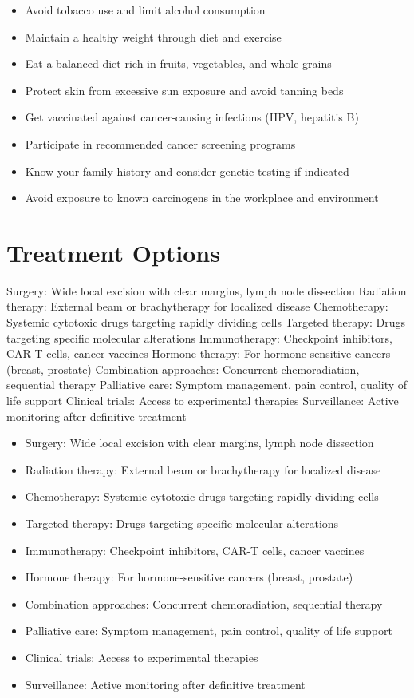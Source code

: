 \begin{itemize}[noitemsep]
  \item Avoid tobacco use and limit alcohol consumption
  \item Maintain a healthy weight through diet and exercise
  \item Eat a balanced diet rich in fruits, vegetables, and whole grains
  \item Protect skin from excessive sun exposure and avoid tanning beds
  \item Get vaccinated against cancer-causing infections (HPV, hepatitis B)
  \item Participate in recommended cancer screening programs
  \item Know your family history and consider genetic testing if indicated
  \item Avoid exposure to known carcinogens in the workplace and environment
\end{itemize}
\section{Treatment Options}
Surgery: Wide local excision with clear margins, lymph node dissection Radiation therapy: External beam or brachytherapy for localized disease Chemotherapy: Systemic cytotoxic drugs targeting rapidly dividing cells Targeted therapy: Drugs targeting specific molecular alterations Immunotherapy: Checkpoint inhibitors, CAR-T cells, cancer vaccines Hormone therapy: For hormone-sensitive cancers (breast, prostate) Combination approaches: Concurrent chemoradiation, sequential therapy Palliative care: Symptom management, pain control, quality of life support Clinical trials: Access to experimental therapies Surveillance: Active monitoring after definitive treatment

\begin{itemize}[noitemsep]
  \item Surgery: Wide local excision with clear margins, lymph node dissection
  \item Radiation therapy: External beam or brachytherapy for localized disease
  \item Chemotherapy: Systemic cytotoxic drugs targeting rapidly dividing cells
  \item Targeted therapy: Drugs targeting specific molecular alterations
  \item Immunotherapy: Checkpoint inhibitors, CAR-T cells, cancer vaccines
  \item Hormone therapy: For hormone-sensitive cancers (breast, prostate)
  \item Combination approaches: Concurrent chemoradiation, sequential therapy
  \item Palliative care: Symptom management, pain control, quality of life support
  \item Clinical trials: Access to experimental therapies
  \item Surveillance: Active monitoring after definitive treatment
\end{itemize}
